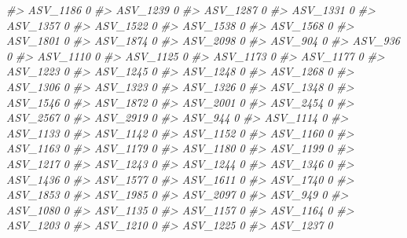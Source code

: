 \documentclass[
]{article}
\newenvironment{Shaded}{\begin{snugshade}}{\end{snugshade}}
\newcommand{\CommentTok}[1]{\textcolor[rgb]{0.56,0.35,0.01}{\textit{#1}}}
\begin{document}
\begin{Shaded}
\begin{Highlighting}[]
\CommentTok{\#\textgreater{} ASV\_1186  0}
\CommentTok{\#\textgreater{} ASV\_1239  0}
\CommentTok{\#\textgreater{} ASV\_1287  0}
\CommentTok{\#\textgreater{} ASV\_1331  0}
\CommentTok{\#\textgreater{} ASV\_1357  0}
\CommentTok{\#\textgreater{} ASV\_1522  0}
\CommentTok{\#\textgreater{} ASV\_1538  0}
\CommentTok{\#\textgreater{} ASV\_1568  0}
\CommentTok{\#\textgreater{} ASV\_1801  0}
\CommentTok{\#\textgreater{} ASV\_1874  0}
\CommentTok{\#\textgreater{} ASV\_2098  0}
\CommentTok{\#\textgreater{} ASV\_904   0}
\CommentTok{\#\textgreater{} ASV\_936   0}
\CommentTok{\#\textgreater{} ASV\_1110  0}
\CommentTok{\#\textgreater{} ASV\_1125  0}
\CommentTok{\#\textgreater{} ASV\_1173  0}
\CommentTok{\#\textgreater{} ASV\_1177  0}
\CommentTok{\#\textgreater{} ASV\_1223  0}
\CommentTok{\#\textgreater{} ASV\_1245  0}
\CommentTok{\#\textgreater{} ASV\_1248  0}
\CommentTok{\#\textgreater{} ASV\_1268  0}
\CommentTok{\#\textgreater{} ASV\_1306  0}
\CommentTok{\#\textgreater{} ASV\_1323  0}
\CommentTok{\#\textgreater{} ASV\_1326  0}
\CommentTok{\#\textgreater{} ASV\_1348  0}
\CommentTok{\#\textgreater{} ASV\_1546  0}
\CommentTok{\#\textgreater{} ASV\_1872  0}
\CommentTok{\#\textgreater{} ASV\_2001  0}
\CommentTok{\#\textgreater{} ASV\_2454  0}
\CommentTok{\#\textgreater{} ASV\_2567  0}
\CommentTok{\#\textgreater{} ASV\_2919  0}
\CommentTok{\#\textgreater{} ASV\_944   0}
\CommentTok{\#\textgreater{} ASV\_1114  0}
\CommentTok{\#\textgreater{} ASV\_1133  0}
\CommentTok{\#\textgreater{} ASV\_1142  0}
\CommentTok{\#\textgreater{} ASV\_1152  0}
\CommentTok{\#\textgreater{} ASV\_1160  0}
\CommentTok{\#\textgreater{} ASV\_1163  0}
\CommentTok{\#\textgreater{} ASV\_1179  0}
\CommentTok{\#\textgreater{} ASV\_1180  0}
\CommentTok{\#\textgreater{} ASV\_1199  0}
\CommentTok{\#\textgreater{} ASV\_1217  0}
\CommentTok{\#\textgreater{} ASV\_1243  0}
\CommentTok{\#\textgreater{} ASV\_1244  0}
\CommentTok{\#\textgreater{} ASV\_1346  0}
\CommentTok{\#\textgreater{} ASV\_1436  0}
\CommentTok{\#\textgreater{} ASV\_1577  0}
\CommentTok{\#\textgreater{} ASV\_1611  0}
\CommentTok{\#\textgreater{} ASV\_1740  0}
\CommentTok{\#\textgreater{} ASV\_1853  0}
\CommentTok{\#\textgreater{} ASV\_1985  0}
\CommentTok{\#\textgreater{} ASV\_2097  0}
\CommentTok{\#\textgreater{} ASV\_949   0}
\CommentTok{\#\textgreater{} ASV\_1080  0}
\CommentTok{\#\textgreater{} ASV\_1135  0}
\CommentTok{\#\textgreater{} ASV\_1157  0}
\CommentTok{\#\textgreater{} ASV\_1164  0}
\CommentTok{\#\textgreater{} ASV\_1203  0}
\CommentTok{\#\textgreater{} ASV\_1210  0}
\CommentTok{\#\textgreater{} ASV\_1225  0}
\CommentTok{\#\textgreater{} ASV\_1237  0}

\end{Highlighting}
\end{Shaded}
\end{document}

